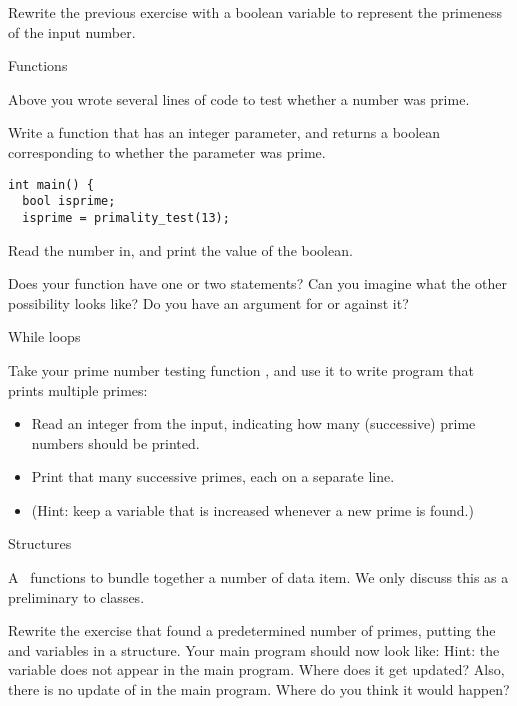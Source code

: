 \begin{exercise}
  \label{ex:prime:test2}
  Rewrite the previous exercise with a boolean variable to represent
  the primeness of the input number.
\end{exercise}

 {Functions}

\prerequisite{\ref{ch:function}}

Above you wrote several lines of code to test whether a number was
prime.

\begin{exercise}
  \label{ex:prime:func}
  Write a function  that has an integer parameter, and returns a boolean
  corresponding to whether the parameter was prime.
\begin{verbatim}
int main() {
  bool isprime;
  isprime = primality_test(13);
\end{verbatim}
  Read the number in, and print the value of the boolean.

  Does your function have one or two  statements?
  Can you imagine what the other possibility looks like?
  Do you have an argument for or against it?
\end{exercise}

 {While loops}

\prerequisite{\ref{sec:loopuntil}}

\begin{exercise}
  \label{ex:prime:while}
  Take your prime number testing function , and use it to
  write program that prints multiple primes:
  \begin{itemize}
  \item Read an integer  from the input, indicating how
    many (successive) prime numbers should be printed.
  \item Print that many successive primes, each on a separate line.
  \item (Hint: keep a variable
     that is increased whenever a new prime is found.)
  \end{itemize}
\end{exercise}

 {Structures}

\prerequisite{\ref{sec:struct}, \ref{sec:reference}}

A~ functions to bundle together a number of data item. We
only discuss this as a preliminary to classes.

\begin{exercise}
  \label{ex:prime:struct}
  Rewrite the exercise that found a predetermined number of primes,
  putting the  and
   variables in a structure. Your main program should
  now look like:
  Hint: the variable  does not appear in the
  main program. Where does it get updated? Also, there is no update of
   in the main program. Where do you think
  it would happen?
\end{exercise}


